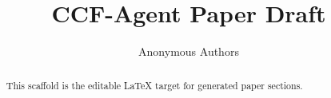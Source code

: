 \documentclass[11pt]{article}
\title{CCF-Agent Paper Draft}
\author{Anonymous Authors}
\date{}
\begin{document}
\maketitle

\begin{abstract}
This scaffold is the editable LaTeX target for generated paper sections.
\end{abstract}






% 
\end{document}
